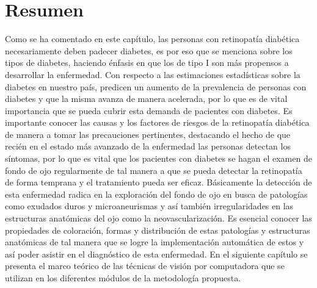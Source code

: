 
\section{Resumen}

Como se ha comentado en este capítulo, las personas con retinopatía diabética necesariamente deben padecer diabetes, es por eso que se menciona sobre los tipos de diabetes, haciendo énfasis en que los de tipo I son más propensos a desarrollar la enfermedad. Con respecto a las estimaciones estadísticas sobre la diabetes en nuestro país, predicen un aumento de la prevalencia de personas con diabetes y que la misma avanza de manera acelerada, por lo que es de vital importancia que se pueda cubrir esta demanda de pacientes con diabetes. Es importante conocer las causas y los factores de riesgos de la retinopatía diabética de manera a tomar las precauciones pertinentes, destacando  el hecho de que recién en el estado más avanzado de la enfermedad las personas detectan los síntomas, por lo que es vital que los pacientes con diabetes se hagan el examen de fondo de ojo regularmente de tal manera a que se pueda detectar la retinopatía de forma temprana y el tratamiento pueda ser  eficaz.
Básicamente la detección de esta enfermedad radica en la exploración del fondo de ojo en busca de patologías como exudados duros y microaneurismas y así también irregularidades en las estructuras anatómicas del ojo como la neovascularización. Es esencial conocer las propiedades de coloración, formas y distribución de estas patologías y estructuras anatómicas de tal manera que se logre la implementación automática de estos y así poder asistir en el diagnóstico de esta enfermedad.
En el siguiente capítulo se presenta el marco teórico  de las técnicas de visión por computadora que se utilizan en los diferentes módulos de la metodología propuesta.



